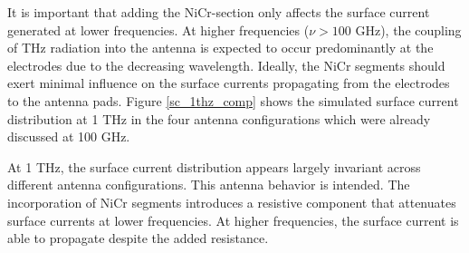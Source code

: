 It is important that adding the NiCr-section only affects the surface current generated at lower frequencies. At higher frequencies ($\nu > 100$ \si{\giga \hertz}), the coupling of THz radiation into the antenna is expected to occur predominantly at the electrodes due to the decreasing wavelength. Ideally, the NiCr segments should exert minimal influence on the surface currents propagating from the electrodes to the antenna pads. Figure \ref{sc_1thz_comp} shows the simulated surface current distribution at \num{1} \si{\tera \hertz} in the four antenna configurations which were already discussed at \num{100} \si{\giga \hertz}. 

At \num{1} \si{\tera \hertz}, the surface current distribution appears largely invariant across different antenna configurations. This antenna behavior is intended. The incorporation of NiCr segments introduces a resistive component that attenuates surface currents at lower frequencies. At higher frequencies, the surface current is able to propagate despite the added resistance. 



